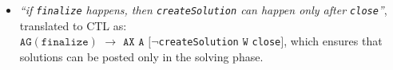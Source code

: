 \begin{itemize}
    \item \emph{``if \texttt{finalize} happens, then \texttt{createSolution} can happen only after \texttt{close}''}, translated to CTL as:\\ $\mathtt{AG}(\texttt{finalize})$ $\rightarrow$ $\mathtt{AX}$ $\mathtt{A}$ $[\neg$\texttt{createSolution} $\mathtt{W}$ \texttt{close}$]$, which ensures that solutions can be posted only in the solving phase.
\end{itemize}



